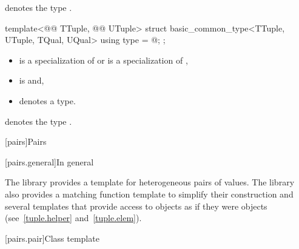 \documentclass{wg21}
\begin{document}
\begin{addedblock}
\begin{itemdescr}
 denotes the type .

\end{itemdescr}

\begin{itemdecl}
template<@@ TTuple, @@ UTuple>
struct basic_common_type<TTuple, UTuple, TQual, UQual> {
    using type = @\seebelow@;
};
\end{itemdecl}

\begin{itemdescr}
\constraints
\begin{itemize}
    \item {} is a specialization of  or  is a specialization of ,
    \item {} is  and,
    \item {} denotes a type.
\end{itemize}

 denotes the type .

\end{itemdescr}


\end{addedblock}

[pairs]{Pairs}

[pairs.general]{In general}

\pnum
The library provides a template for heterogeneous pairs of values.
The library also provides a matching function template to simplify
their construction and several templates that provide access to 
objects as if they were  objects (see~\ref{tuple.helper}
and~\ref{tuple.elem}).%
%
%
%

[pairs.pair]{Class template }
\end{document}
